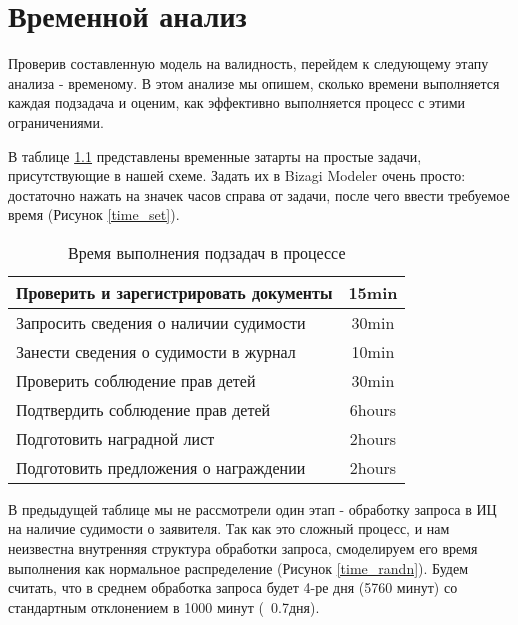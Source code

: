 \chapter{Временной анализ}

Проверив составленную модель на валидность, перейдем
к следующему этапу анализа - временому. В этом анализе
мы опишем, сколько времени выполняется каждая подзадача
и оценим, как эффективно выполняется процесс с этими
ограничениями.

В таблице \ref{table:time} представлены временные затарты
на простые задачи, присутствующие в нашей схеме. Задать их
в Bizagi Modeler очень просто: достаточно нажать на значек
часов справа от задачи, после чего ввести требуемое время
(Рисунок \ref{time_set}).

\begin{table}
    \begin{tabular}{|l|c|}
        \hline
        Проверить и зарегистрировать документы & 15min \\ \hline
        Запросить сведения о наличии судимости & 30min \\ \hline
        Занести сведения о судимости в журнал & 10min \\ \hline
        Проверить соблюдение прав детей & 30min \\ \hline
        Подтвердить соблюдение прав детей & 6hours \\ \hline
        Подготовить наградной лист & 2hours \\ \hline
        Подготовить предложения о награждении & 2hours \\ \hline
    \end{tabular}
    \caption{Время выполнения подзадач в процессе}
    \label{table:time}
\end{table}

\clearpage


В предыдущей таблице мы не рассмотрели один этап -
обработку запроса в ИЦ на наличие судимости о заявителя.
Так как это сложный процесс, и нам неизвестна внутренняя
структура обработки запроса, смоделируем его время выполнения
как нормальное распределение (Рисунок \ref{time_randn}).
Будем считать, что в среднем обработка запроса будет
4-ре дня (5760 минут) со стандартным отклонением в 1000 минут
(~0.7дня).

